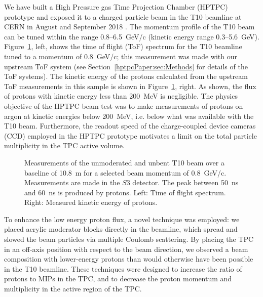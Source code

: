 We have built a High Pressure gas Time Projection Chamber (HPTPC) prototype and exposed it to a charged particle beam in the T10 beamline at CERN in August and September 2018 \cite{SPSC-P-355}.
The momentum profile of the T10 beam can be tuned within the range 0.8--6.5~GeV/c (kinetic energy range 0.3--5.6~GeV). 
Figure~\ref{fig:utofNoBend}, left, shows the time of flight (ToF) spectrum for the T10 beamline tuned to a momentum of 0.8~GeV/c; this measurement was made with our upstream ToF system (see Section~\ref{hptpcPaper:sec:Methods} for details of the ToF systems).
The kinetic energy of the protons calculated from the upstream ToF measurements in this sample is shown in Figure~\ref{fig:utofNoBend}, right.
As shown, the flux of protons with kinetic energy less than 200~MeV is negligible.
The physics objective of the HPTPC beam test was to make measurements of protons on argon at kinetic energies below 200~MeV, i.e. below what was available with the T10 beam. 
Furthermore, the readout speed of the charge-coupled device cameras (CCD) employed in the HPTPC prototype motivates a limit on the total particle multiplicity in the TPC active volume.

\begin{figure}
  \begin{minipage}[t]{0.49\textwidth}
    \centering
    \begin{adjustbox}{max totalsize={\textwidth},center}
      
    \end{adjustbox}
  \end{minipage}
  \hfill
  \begin{minipage}[t]{0.49\textwidth}
    \centering
    \begin{adjustbox}{max totalsize={\textwidth},center}
      
    \end{adjustbox}
  \end{minipage}
  \caption{\label{fig:utofNoBend}Measurements of the unmoderated and unbent T10 beam over a baseline of 10.8~m for a selected beam momentum of 0.8~GeV/c. Measurements are made in the $\mathit{S3}$ detector. The peak between 50~ns and 60~ns is produced by protons. Left: Time of flight spectrum. Right: Measured kinetic energy of protons.}
\end{figure}

To enhance the low energy proton flux, a novel technique was employed:
we placed acrylic moderator blocks directly in the beamline, which spread and slowed the beam particles via multiple Coulomb scattering.
By placing the TPC in an off-axis position with respect to the beam direction, we observed a beam composition with lower-energy protons than would otherwise have been possible in the T10 beamline.
These techniques were designed to increase the ratio of protons to MIPs in the TPC, and to decrease the proton momentum and multiplicity in the active region of the TPC.

